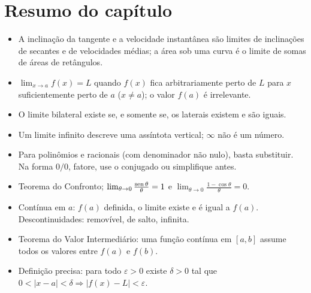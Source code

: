 \section*{Resumo do capítulo}
\begin{itemize}
\item A inclinação da tangente e a velocidade instantânea são limites de inclinações de
  secantes e de velocidades médias; a área sob uma curva é o limite de somas de áreas de
  retângulos.
\item $\lim_{x\to a}f(x)=L$ quando $f(x)$ fica arbitrariamente perto de $L$ para $x$
  suficientemente perto de $a$ ($x\neq a$); o valor $f(a)$ é irrelevante.
\item O limite bilateral existe se, e somente se, os laterais existem e são iguais.
\item Um limite infinito descreve uma assíntota vertical; $\infty$ não é um número.
\item Para polinômios e racionais (com denominador não nulo), basta substituir.
  Na forma $0/0$, fatore, use o conjugado ou simplifique antes.
\item Teorema do Confronto; $\lim_{\theta\to0}\frac{\operatorname{sen}\theta}{\theta}=1$ e
  $\lim_{\theta\to0}\frac{1-\cos\theta}{\theta}=0$.
\item Contínua em $a$: $f(a)$ definida, o limite existe e é igual a $f(a)$.
  Descontinuidades: removível, de salto, infinita.
\item Teorema do Valor Intermediário: uma função contínua em $[a,b]$ assume todos os
  valores entre $f(a)$ e $f(b)$.
\item Definição precisa: para todo $\varepsilon>0$ existe $\delta>0$ tal que
  $0<|x-a|<\delta\Rightarrow|f(x)-L|<\varepsilon$.
\end{itemize}


